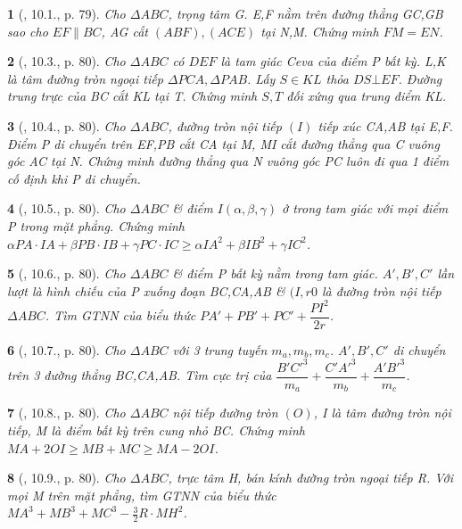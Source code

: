 \documentclass{article}
\newtheorem{baitoan}{}
\begin{document}
\begin{baitoan}[\cite{Hai_Hung_Thu_Tung2022_tap_1}, 10.1., p. 79]
	Cho $\Delta ABC$, trọng tâm G. E,F nằm trên đường thẳng GC,GB sao cho $EF\parallel BC$, AG cắt $(ABF),(ACE)$ tại N,M. Chứng minh $FM = EN$.
\end{baitoan}

\begin{baitoan}[\cite{Hai_Hung_Thu_Tung2022_tap_1}, 10.3., p. 80]
	Cho $\Delta ABC$ có $DEF$ là tam giác Ceva của điểm P bất kỳ. L,K là tâm đường tròn ngoại tiếp $\Delta PCA,\Delta PAB$. Lấy $S\in KL$ thỏa $DS\bot EF$. Đường trung trực của BC cắt KL tại T. Chứng minh $S,T$ đối xứng qua trung điểm KL.
\end{baitoan}

\begin{baitoan}[\cite{Hai_Hung_Thu_Tung2022_tap_1}, 10.4., p. 80]
	Cho $\Delta ABC$, đường tròn nội tiếp $(I)$ tiếp xúc CA,AB tại E,F. Điểm P di chuyển trên EF,PB cắt CA tại M, MI cắt đường thẳng qua C vuông góc AC tại N. Chứng minh đường thẳng qua N vuông góc PC luôn đi qua 1 điểm cố định khi P di chuyển.
\end{baitoan}

\begin{baitoan}[\cite{Hai_Hung_Thu_Tung2022_tap_1}, 10.5., p. 80]
	Cho $\Delta ABC$ \& điểm $I(\alpha,\beta,\gamma)$ ở trong tam giác với mọi điểm P trong mặt phẳng. Chứng minh $\alpha PA\cdot IA + \beta PB\cdot IB + \gamma PC\cdot IC\ge\alpha IA^2 + \beta IB^2 + \gamma IC^2$.
\end{baitoan}

\begin{baitoan}[\cite{Hai_Hung_Thu_Tung2022_tap_1}, 10.6., p. 80]
	Cho $\Delta ABC$ \& điểm P bất kỳ nằm trong tam giác. $A',B',C'$ lần lượt là hình chiếu của P xuống đoạn BC,CA,AB \& $(I,r0$ là đường tròn nội tiếp $\Delta ABC$. Tìm {\rm GTNN} của biểu thức $PA' + PB' + PC' + \dfrac{PI^2}{2r}$.
\end{baitoan}

\begin{baitoan}[\cite{Hai_Hung_Thu_Tung2022_tap_1}, 10.7., p. 80]
	Cho $\Delta ABC$ với 3 trung tuyến $m_a,m_b,m_c$. $A',B',C'$ di chuyển trên 3 đường thẳng BC,CA,AB. Tìm cực trị của $\dfrac{B'C'^3}{m_a} + \dfrac{C'A'^3}{m_b} + \dfrac{A'B'^3}{m_c}$.
\end{baitoan}

\begin{baitoan}[\cite{Hai_Hung_Thu_Tung2022_tap_1}, 10.8., p. 80]
	Cho $\Delta ABC$ nội tiếp đường tròn $(O)$, I là tâm đường tròn nội tiếp, M là điểm bất kỳ trên cung nhỏ BC. Chứng minh $MA + 2OI\ge MB + MC\ge MA - 2OI$.
\end{baitoan}

\begin{baitoan}[\cite{Hai_Hung_Thu_Tung2022_tap_1}, 10.9., p. 80]
	Cho $\Delta ABC$, trực tâm H, bán kính đường tròn ngoại tiếp R. Với mọi M trên mặt phẳng, tìm {\rm GTNN} của biểu thức $MA^3 + MB^3 + MC^3 - \frac{3}{2}R\cdot MH^2$.
\end{baitoan}


\printbibliography[heading=bibintoc]
	
\end{document}
